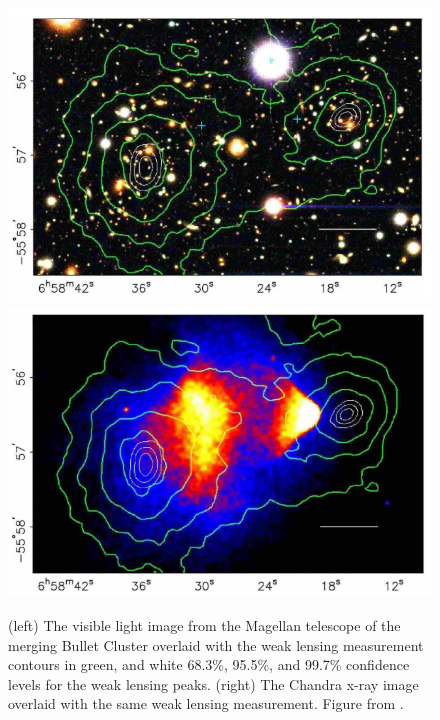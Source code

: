 \begin{figure}[htbp]
\begin{center}
\includegraphics[width=\halffig]{figures/theory/bullet1.png}
\includegraphics[width=\halffig]{figures/theory/bullet2.png}
\caption{(left) The visible light image from the Magellan telescope of the merging Bullet Cluster overlaid with the weak lensing measurement contours in green, and white 68.3\%, 95.5\%, and 99.7\% confidence levels for the weak lensing peaks. (right) The Chandra x-ray image overlaid with the same weak lensing measurement. Figure from \cite{Clowe2006}. }
\label{fig:bullet}
\end{center}
\end{figure}


